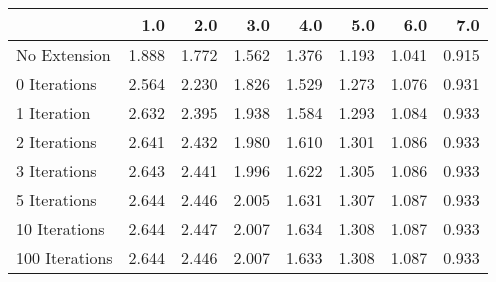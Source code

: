\begin{tabular}{lrrrrrrr}
\toprule
{} &   1.0 &   2.0 &   3.0 &   4.0 &   5.0 &   6.0 &   7.0 \\
\midrule
No Extension   & 1.888 & 1.772 & 1.562 & 1.376 & 1.193 & 1.041 & 0.915 \\
0 Iterations   & 2.564 & 2.230 & 1.826 & 1.529 & 1.273 & 1.076 & 0.931 \\
1 Iteration    & 2.632 & 2.395 & 1.938 & 1.584 & 1.293 & 1.084 & 0.933 \\
2 Iterations   & 2.641 & 2.432 & 1.980 & 1.610 & 1.301 & 1.086 & 0.933 \\
3 Iterations   & 2.643 & 2.441 & 1.996 & 1.622 & 1.305 & 1.086 & 0.933 \\
5 Iterations   & 2.644 & 2.446 & 2.005 & 1.631 & 1.307 & 1.087 & 0.933 \\
10 Iterations  & 2.644 & 2.447 & 2.007 & 1.634 & 1.308 & 1.087 & 0.933 \\
100 Iterations & 2.644 & 2.446 & 2.007 & 1.633 & 1.308 & 1.087 & 0.933 \\
\bottomrule
\end{tabular}
